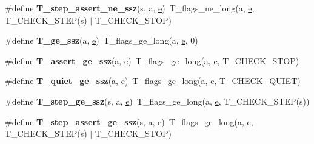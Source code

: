 \begin{DoxyCompactItemize}
\#define {\bfseries T\+\_\+step\+\_\+assert\+\_\+ne\+\_\+ssz}(s,  a,  \mbox{\hyperlink{sun4u_2tte_8h_a8b0b9ed08e0e18920ec2682f48228c27}{e}})~T\+\_\+flags\+\_\+ne\+\_\+long(a, \mbox{\hyperlink{sun4u_2tte_8h_a8b0b9ed08e0e18920ec2682f48228c27}{e}}, T\+\_\+\+C\+H\+E\+C\+K\+\_\+\+S\+T\+EP(s) $\vert$ T\+\_\+\+C\+H\+E\+C\+K\+\_\+\+S\+T\+OP)
\item 
\mbox{\label{group__RTEMSTestFrameworkChecksSSZ_ga6d9552453db69f702775cbc4f8550a37}} 
\#define {\bfseries T\+\_\+ge\+\_\+ssz}(a,  \mbox{\hyperlink{sun4u_2tte_8h_a8b0b9ed08e0e18920ec2682f48228c27}{e}})~T\+\_\+flags\+\_\+ge\+\_\+long(a, \mbox{\hyperlink{sun4u_2tte_8h_a8b0b9ed08e0e18920ec2682f48228c27}{e}}, 0)
\item 
\mbox{\label{group__RTEMSTestFrameworkChecksSSZ_gab593c15e6cc4262d2247899b5df99e1f}} 
\#define {\bfseries T\+\_\+assert\+\_\+ge\+\_\+ssz}(a,  \mbox{\hyperlink{sun4u_2tte_8h_a8b0b9ed08e0e18920ec2682f48228c27}{e}})~T\+\_\+flags\+\_\+ge\+\_\+long(a, \mbox{\hyperlink{sun4u_2tte_8h_a8b0b9ed08e0e18920ec2682f48228c27}{e}}, T\+\_\+\+C\+H\+E\+C\+K\+\_\+\+S\+T\+OP)
\item 
\mbox{\label{group__RTEMSTestFrameworkChecksSSZ_gac95caa77eeee5d4b9f5b9db27bb72c3d}} 
\#define {\bfseries T\+\_\+quiet\+\_\+ge\+\_\+ssz}(a,  \mbox{\hyperlink{sun4u_2tte_8h_a8b0b9ed08e0e18920ec2682f48228c27}{e}})~T\+\_\+flags\+\_\+ge\+\_\+long(a, \mbox{\hyperlink{sun4u_2tte_8h_a8b0b9ed08e0e18920ec2682f48228c27}{e}}, T\+\_\+\+C\+H\+E\+C\+K\+\_\+\+Q\+U\+I\+ET)
\item 
\mbox{\label{group__RTEMSTestFrameworkChecksSSZ_gaf6b0d748910def5940775dd10d24b312}} 
\#define {\bfseries T\+\_\+step\+\_\+ge\+\_\+ssz}(s,  a,  \mbox{\hyperlink{sun4u_2tte_8h_a8b0b9ed08e0e18920ec2682f48228c27}{e}})~T\+\_\+flags\+\_\+ge\+\_\+long(a, \mbox{\hyperlink{sun4u_2tte_8h_a8b0b9ed08e0e18920ec2682f48228c27}{e}}, T\+\_\+\+C\+H\+E\+C\+K\+\_\+\+S\+T\+EP(s))
\item 
\mbox{\label{group__RTEMSTestFrameworkChecksSSZ_gaf916add3cf55e359fdf0e44b81d2c457}} 
\#define {\bfseries T\+\_\+step\+\_\+assert\+\_\+ge\+\_\+ssz}(s,  a,  \mbox{\hyperlink{sun4u_2tte_8h_a8b0b9ed08e0e18920ec2682f48228c27}{e}})~T\+\_\+flags\+\_\+ge\+\_\+long(a, \mbox{\hyperlink{sun4u_2tte_8h_a8b0b9ed08e0e18920ec2682f48228c27}{e}}, T\+\_\+\+C\+H\+E\+C\+K\+\_\+\+S\+T\+EP(s) $\vert$ T\+\_\+\+C\+H\+E\+C\+K\+\_\+\+S\+T\+OP)

\end{DoxyCompactItemize}
